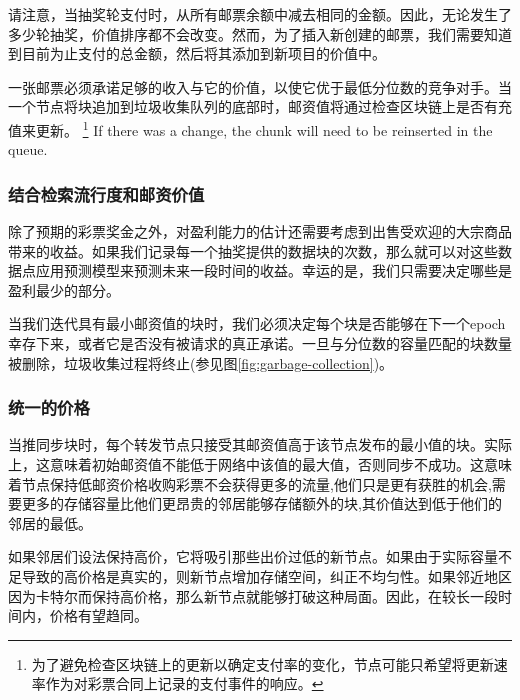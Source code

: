 请注意，当抽奖轮支付时，从所有邮票余额中减去相同的金额。因此，无论发生了多少轮抽奖，价值排序都不会改变。然而，为了插入新创建的邮票，我们需要知道到目前为止支付的总金额，然后将其添加到新项目的价值中。

一张邮票必须承诺足够的收入与它的价值，以使它优于最低分位数的竞争对手。当一个节点将块追加到垃圾收集队列的底部时，邮资值将通过检查区块链上是否有充值来更新。%
%
\footnote{为了避免检查区块链上的更新以确定支付率的变化，节点可能只希望将更新速率作为对彩票合同上记录的支付事件的响应。}
%
If there was a change, the chunk will need to be reinserted in the queue. 

\subsubsection{结合检索流行度和邮资价值}

除了预期的彩票奖金之外，对盈利能力的估计还需要考虑到出售受欢迎的大宗商品带来的收益。如果我们记录每一个抽奖提供的数据块的次数，那么就可以对这些数据点应用预测模型来预测未来一段时间的收益。幸运的是，我们只需要决定哪些是盈利最少的部分。 



当我们迭代具有最小邮资值的块时，我们必须决定每个块是否能够在下一个epoch幸存下来，或者它是否没有被请求的真正承诺。一旦与分位数的容量匹配的块数量被删除，垃圾收集过程将终止(参见图\ref{fig:garbage-collection})。

\subsubsection{统一的价格} 

当推同步块时，每个转发节点只接受其邮资值高于该节点发布的最小值的块。实际上，这意味着初始邮资值不能低于网络中该值的最大值，否则同步不成功。这意味着节点保持低邮资价格收购彩票不会获得更多的流量,他们只是更有获胜的机会,需要更多的存储容量比他们更昂贵的邻居能够存储额外的块,其价值达到低于他们的邻居的最低。

如果邻居们设法保持高价，它将吸引那些出价过低的新节点。如果由于实际容量不足导致的高价格是真实的，则新节点增加存储空间，纠正不均匀性。如果邻近地区因为卡特尔而保持高价格，那么新节点就能够打破这种局面。因此，在较长一段时间内，价格有望趋同。








